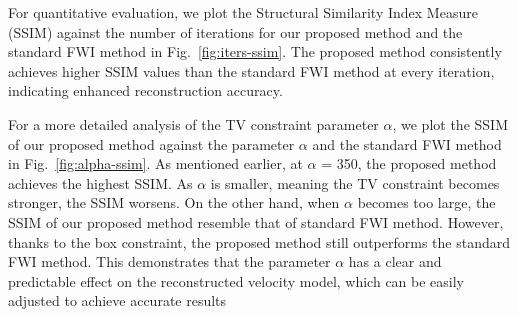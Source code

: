 For quantitative evaluation, we plot the Structural Similarity Index Measure (SSIM) against the number of iterations for our proposed method and the standard FWI method in Fig.~\ref{fig:iters-ssim}.
The proposed method consistently achieves higher SSIM values than the standard FWI method at every iteration, indicating enhanced reconstruction accuracy.

For a more detailed analysis of the TV constraint parameter $\alpha$, we plot the SSIM of our proposed method against the parameter $\alpha$ and the standard FWI method in Fig.~\ref{fig:alpha-ssim}.
As mentioned earlier, at $\alpha$ = 350, the proposed method achieves the highest SSIM.
As $\alpha$ is smaller, meaning the TV constraint becomes stronger, the SSIM worsens.
On the other hand, when $\alpha$ becomes too large, the SSIM of our proposed method resemble that of standard FWI method.
However, thanks to the box constraint, the proposed method still outperforms the standard FWI method.
This demonstrates that the parameter $\alpha$ has a clear and predictable effect on the reconstructed velocity model, which can be easily adjusted to achieve accurate results
